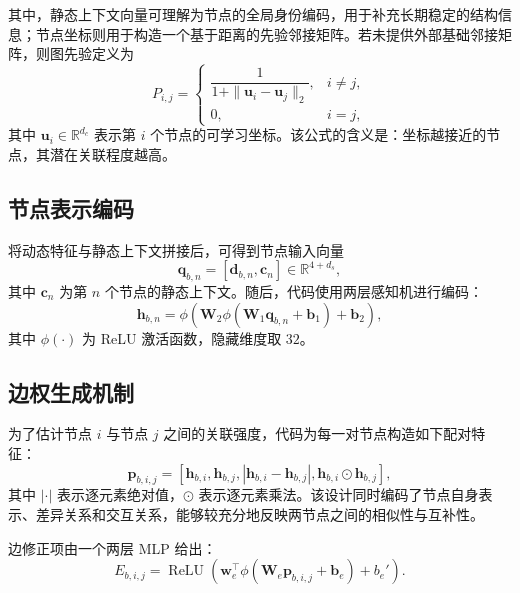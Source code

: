 其中，静态上下文向量可理解为节点的全局身份编码，用于补充长期稳定的结构信息；节点坐标则用于构造一个基于距离的先验邻接矩阵。若未提供外部基础邻接矩阵，则图先验定义为
\begin{equation}
    P_{i,j} =
    \begin{cases}
        \dfrac{1}{1+\|\mathbf{u}_i - \mathbf{u}_j\|_2}, & i \neq j, \\
        0, & i=j,
    \end{cases}
\end{equation}
其中 $\mathbf{u}_i \in \mathbb{R}^{d_c}$ 表示第 $i$ 个节点的可学习坐标。该公式的含义是：坐标越接近的节点，其潜在关联程度越高。

\subsection{节点表示编码}

将动态特征与静态上下文拼接后，可得到节点输入向量
\begin{equation}
    \mathbf{q}_{b,n} = [\mathbf{d}_{b,n}, \mathbf{c}_n] \in \mathbb{R}^{4+d_s},
\end{equation}
其中 $\mathbf{c}_n$ 为第 $n$ 个节点的静态上下文。随后，代码使用两层感知机进行编码：
\begin{equation}
    \mathbf{h}_{b,n} =
    \phi\left(
        \mathbf{W}_2
        \phi(\mathbf{W}_1 \mathbf{q}_{b,n} + \mathbf{b}_1)
        + \mathbf{b}_2
    \right),
\end{equation}
其中 $\phi(\cdot)$ 为 ReLU 激活函数，隐藏维度取 $32$。

\subsection{边权生成机制}

为了估计节点 $i$ 与节点 $j$ 之间的关联强度，代码为每一对节点构造如下配对特征：
\begin{equation}
    \mathbf{p}_{b,i,j} =
    [\mathbf{h}_{b,i},
    \mathbf{h}_{b,j},
    |\mathbf{h}_{b,i} - \mathbf{h}_{b,j}|,
    \mathbf{h}_{b,i} \odot \mathbf{h}_{b,j}],
\end{equation}
其中 $|\cdot|$ 表示逐元素绝对值，$\odot$ 表示逐元素乘法。该设计同时编码了节点自身表示、差异关系和交互关系，能够较充分地反映两节点之间的相似性与互补性。

边修正项由一个两层 MLP 给出：
\begin{equation}
    E_{b,i,j} = \operatorname{ReLU}\!\left(
        \mathbf{w}_e^\top
        \phi(\mathbf{W}_e \mathbf{p}_{b,i,j} + \mathbf{b}_e)
        + b_e'
    \right).
\end{equation}

